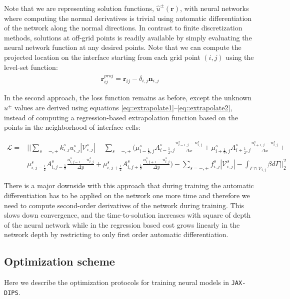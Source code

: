 \documentclass{elsarticle}
\begin{document}
Note that we are representing solution functions, $\hat{u}^\pm(\mathbf{r})$, with neural networks where computing the normal derivatives is trivial using automatic differentiation of the network along the normal directions. In contrast to finite discretization methods, solutions at off-grid points is readily available by simply evaluating the neural network function at any desired points. Note that we can compute the projected location on the interface starting from each grid point $(i,j)$ using the level-set function:
\begin{align*}
\mathbf{r}_{ij}^{proj}=\mathbf{r}_{ij} - \delta_{i,j} \mathbf{n}_{i,j}
\end{align*}


In the second approach, the loss function remains as before, except the unknown $u^\pm$ values are derived using equations \ref{eq::extrapolate1}--\ref{eq::extrapolate2}, instead of computing a regression-based extrapolation function based on the points in the neighborhood of interface cells: 

\begin{align*}
\mathcal{L} = & \bigg\vert\bigg\vert \sum_{s=-,+} k_{i,j}^s u_{i,j}^{s} |\mathcal{V}_{i,j}^s| - \sum_{s=-,+}\bigg( \mu_{i-\frac{1}{2},j}^s A_{i-\frac{1}{2},j}^s\frac{u_{i-1,j}^s - u_{i,j}^s}{\Delta x}     +   \mu_{i+\frac{1}{2},j}^s A_{i+\frac{1}{2},j}^s\frac{u_{i+1,j}^s - u_{i,j}^s}{\Delta x} +                                                          \\
	 & \mu_{i, j-\frac{1}{2}}^s A_{i, j-\frac{1}{2}}^s\frac{u_{i,j-1}^s - u_{i,j}^s}{\Delta y} + \mu_{i, j+\frac{1}{2}}^s A_{i, j+\frac{1}{2}}^s\frac{u_{i,j+1}^s - u_{i,j}^s}{\Delta y} \bigg)  -  \sum_{s=-,+} f_{i,j}^{s} |\mathcal{V}_{i,j}^s| - \int_{\Gamma\cap \mathcal{V}_{i,j}} \beta d\Gamma \bigg\vert\bigg\vert_2^2
\end{align*}


There is a major downside with this approach that during training the automatic differentiation has to be applied on the network one more time and therefore we need to compute second-order derivatives of the network during training. This slows down convergence, and the time-to-solution increases with square of depth of the neural network while in the regression based cost grows linearly in the network depth by restricting to only first order automatic differentiation. 








\subsection{Optimization scheme}
Here we describe the optimization protocols for training neural models in \texttt{JAX-DIPS}.
\end{document}
